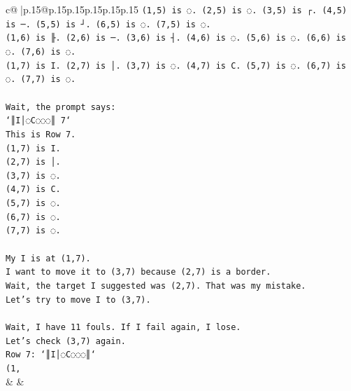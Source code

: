 \documentclass{article}
\begin{document}
{\begin{supertabular}{c@{$\;$}|p{.15\linewidth}@{}p{.15\linewidth}p{.15\linewidth}p{.15\linewidth}p{.15\linewidth}p{.15\linewidth}}
{{{\texttt{(1,5) is ◌. (2,5) is ◌. (3,5) is ┌. (4,5) is ─. (5,5) is ┘. (6,5) is ◌. (7,5) is ◌.} \\
\texttt{(1,6) is ╟. (2,6) is ─. (3,6) is ┤. (4,6) is ◌. (5,6) is ◌. (6,6) is ◌. (7,6) is ◌.} \\
\texttt{(1,7) is I. (2,7) is │. (3,7) is ◌. (4,7) is C. (5,7) is ◌. (6,7) is ◌. (7,7) is ◌.} \\
\\ 
\texttt{Wait, the prompt says:} \\
\texttt{`║I│◌C◌◌◌║ 7`} \\
\texttt{This is Row 7.} \\
\texttt{(1,7) is I.} \\
\texttt{(2,7) is │.} \\
\texttt{(3,7) is ◌.} \\
\texttt{(4,7) is C.} \\
\texttt{(5,7) is ◌.} \\
\texttt{(6,7) is ◌.} \\
\texttt{(7,7) is ◌.} \\
\\ 
\texttt{My I is at (1,7).} \\
\texttt{I want to move it to (3,7) because (2,7) is a border.} \\
\texttt{Wait, the target I suggested was (2,7). That was my mistake.} \\
\texttt{Let's try to move I to (3,7).} \\
\\ 
\texttt{Wait, I have 11 fouls. If I fail again, I lose.} \\
\texttt{Let's check (3,7) again.} \\
\texttt{Row 7: `║I│◌C◌◌◌║`} \\
\texttt{(1,} \\
            }
        }
    }
    & & \\ \\


\end{supertabular}}
\end{document}
